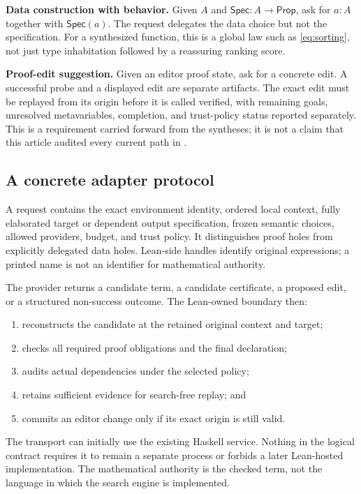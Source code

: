 \documentclass[11pt,a4paper]{article}
\newcommand{\code}[1]{\texttt{\detokenize{#1}}}
\newcommand{\Prop}{\mathsf{Prop}}
\newcommand{\Spec}{\mathsf{Spec}}
\theoremstyle{definition}
\begin{document}
\textbf{Data construction with behavior.} Given $A$ and $\Spec:A\to\Prop$, ask
for $a:A$ together with $\Spec(a)$. The request delegates the data choice but
not the specification. For a synthesized function, this is a global law such
as \eqref{eq:sorting}, not just type inhabitation followed by a reassuring
ranking score.

\textbf{Proof-edit suggestion.} Given an editor proof state, ask for a concrete
edit. A successful probe and a displayed edit are separate artifacts. The
exact edit must be replayed from its origin before it is called verified, with
remaining goals, unresolved metavariables, completion, and trust-policy status
reported separately. This is a requirement carried forward from the syntheses;
it is not a claim that this article audited every current path in
\code{Main.hs} \cite{round2a,round2b}.

\subsection{A concrete adapter protocol}
A request contains the exact environment identity, ordered local context,
fully elaborated target or dependent output specification, frozen semantic
choices, allowed providers, budget, and trust policy. It distinguishes proof
holes from explicitly delegated data holes. Lean-side handles identify original
expressions; a printed name is not an identifier for mathematical authority.

The provider returns a candidate term, a candidate certificate, a proposed edit,
or a structured non-success outcome. The Lean-owned boundary then:
\begin{enumerate}
\item reconstructs the candidate at the retained original context and target;
\item checks all required proof obligations and the final declaration;
\item audits actual dependencies under the selected policy;
\item retains sufficient evidence for search-free replay; and
\item commits an editor change only if its exact origin is still valid.
\end{enumerate}
The transport can initially use the existing Haskell service. Nothing in the
logical contract requires it to remain a separate process or forbids a later
Lean-hosted implementation. The mathematical authority is the checked term,
not the language in which the search engine is implemented.
\end{document}
